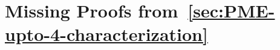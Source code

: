 \documentclass[11pt,letterpaper]{article}
\begin{document}
{{{%

%  
% 

\appendix
\section{Missing Proofs from~\cref{sec:PME-upto-4-characterization}}
\label{appendix:missing-proofs-from-prprelim}

}}}
\end{document}

